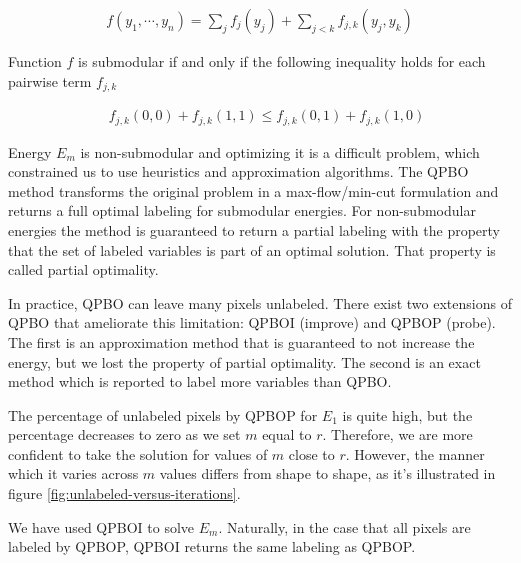 \documentclass[runningheads]{llncs}
\begin{document}
\begin{align*}
f(y_1,\cdots, y_n) = \sum_{j}{f_j(y_j)} + \sum_{j < k}{f_{j,k}(y_j,y_k)}
\end{align*}

Function $f$ is submodular if and only if the following inequality holds for each pairwise term $f_{j,k}$ \cite{kolmogorov04whatenergies}

\begin{align*}
	\quad f_{j,k}(0,0) + f_{j,k}(1,1) \leq f_{j,k}(0,1) + f_{j,k}(1,0)
\end{align*}

Energy $E_m$ is non-submodular and optimizing it is a difficult problem, which
constrained us to use heuristics and approximation algorithms. The QPBO method \cite{rother07qpbo} transforms the 
original problem in a max-flow/min-cut formulation and returns a full optimal labeling for submodular energies. For
non-submodular energies the method is guaranteed to return a partial labeling with the property that the set of labeled
variables is part of an optimal solution. That property is called partial optimality.

In practice, QPBO can leave many pixels unlabeled. There exist two extensions of QPBO that ameliorate this limitation: QPBOI
(improve) and QPBOP (probe). The first is an approximation method that is guaranteed to not increase the energy, but we
lost the property of partial optimality. The second is an exact method which is reported to label more variables than
QPBO. 

The percentage of unlabeled pixels by QPBOP for $E_1$ is quite high, but the percentage decreases to zero as we set $m$ equal to $r$. Therefore, we are more confident to take the solution for values of $m$ close to $r$. However, the manner which it varies across $m$ values differs from shape to shape, as it's illustrated in figure \ref{fig:unlabeled-versus-iterations}. 

We have used QPBOI to solve $E_m$. Naturally, in the case that all pixels are labeled by QPBOP, QPBOI returns the same labeling as QPBOP. 
\end{document}
